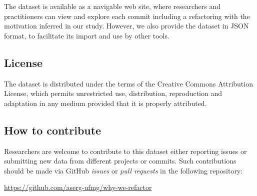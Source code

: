 The dataset is available as a navigable web site, where researchers and practitioners can view and explore each commit including a refactoring with the motivation inferred in our study. However, we also provide the dataset in JSON format, to facilitate its import and use by other tools.

\subsection{License}

\noindent The dataset is distributed under the terms of the Creative Commons Attribution License, which permits unrestricted use, distribution, reproduction and adaptation in any me\-di\-um
provided that it is properly attributed.\\



\subsection{How to contribute}

Researchers are welcome to contribute to this dataset either reporting issues or submitting new data from different projects or commits. Such contributions should be made via GitHub \emph{issues} or \emph{pull requests} in the following repository:\margin

\noindent \url{https://github.com/aserg-ufmg/why-we-refactor}\margin



